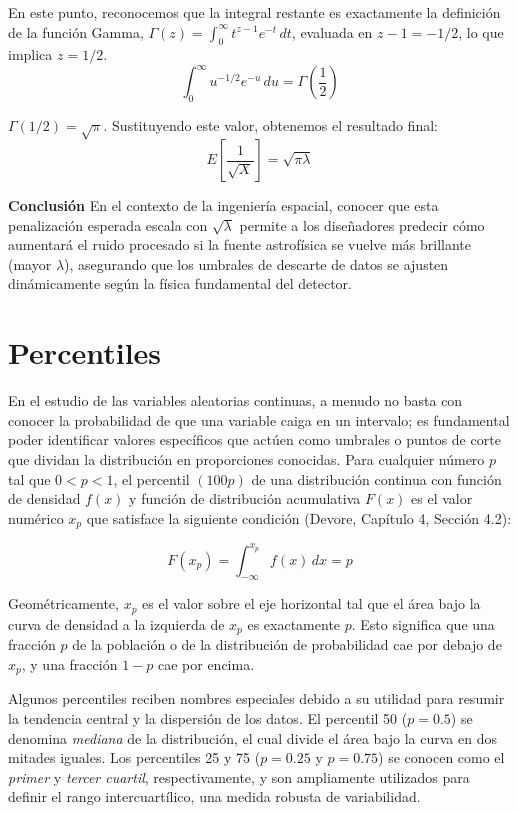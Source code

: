 En este punto, reconocemos que la integral restante es exactamente la definición de la función Gamma, $\Gamma(z) = \int_{0}^{\infty} t^{z-1} e^{-t} \, dt$, evaluada en $z - 1 = -1/2$, lo que implica $z = 1/2$. 
$$ \int_{0}^{\infty} u^{-1/2} e^{-u} \, du = \Gamma\left(\frac{1}{2}\right) $$

$\Gamma(1/2) = \sqrt{\pi}$. Sustituyendo este valor, obtenemos el resultado final:
$$ E\left[\frac{1}{\sqrt{X}}\right] = \sqrt{\pi \lambda} $$

\textbf{Conclusión}
En el contexto de la ingeniería espacial, conocer que esta penalización esperada escala con $\sqrt{\lambda}$ permite a los diseñadores predecir cómo aumentará el ruido procesado si la fuente astrofísica se vuelve más brillante (mayor $\lambda$), asegurando que los umbrales de descarte de datos se ajusten dinámicamente según la física fundamental del detector.


\section{Percentiles}

En el estudio de las variables aleatorias continuas, a menudo no basta con conocer la probabilidad de que una variable caiga en un intervalo; es fundamental poder identificar valores específicos que actúen como umbrales o puntos de corte que dividan la distribución en proporciones conocidas. Para cualquier número $p$ tal que $0 < p < 1$, el percentil $(100p)$ de una distribución continua con función de densidad $f(x)$ y función de distribución acumulativa $F(x)$ es el valor numérico $x_p$ que satisface la siguiente condición (Devore, Capítulo 4, Sección 4.2):

$$ F(x_p) = \int_{-\infty}^{x_p} f(x) \, dx = p $$

Geométricamente, $x_p$ es el valor sobre el eje horizontal tal que el área bajo la curva de densidad a la izquierda de $x_p$ es exactamente $p$. Esto significa que una fracción $p$ de la población o de la distribución de probabilidad cae por debajo de $x_p$, y una fracción $1-p$ cae por encima. 

Algunos percentiles reciben nombres especiales debido a su utilidad para resumir la tendencia central y la dispersión de los datos. El percentil 50 ($p = 0.5$) se denomina \textit{mediana} de la distribución, el cual divide el área bajo la curva en dos mitades iguales. Los percentiles 25 y 75 ($p = 0.25$ y $p = 0.75$) se conocen como el \textit{primer} y \textit{tercer cuartil}, respectivamente, y son ampliamente utilizados para definir el rango intercuartílico, una medida robusta de variabilidad.

